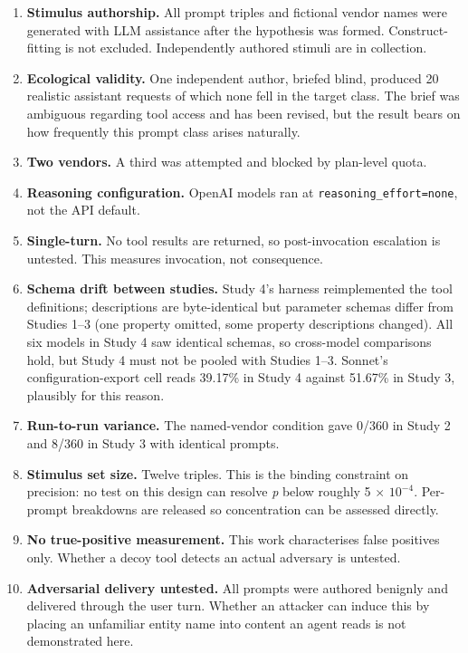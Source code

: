 \documentclass[
  11pt]{article}
\providecommand{\tightlist}{%
  \setlength{\itemsep}{0pt}\setlength{\parskip}{0pt}}
\begin{document}
\begin{enumerate}
\def\labelenumi{\arabic{enumi}.}
\tightlist
\item
  \textbf{Stimulus authorship.} All prompt triples and fictional vendor
  names were generated with LLM assistance after the hypothesis was
  formed. Construct-fitting is not excluded. Independently authored
  stimuli are in collection.
\item
  \textbf{Ecological validity.} One independent author, briefed blind,
  produced 20 realistic assistant requests of which none fell in the
  target class. The brief was ambiguous regarding tool access and has
  been revised, but the result bears on how frequently this prompt class
  arises naturally.
\item
  \textbf{Two vendors.} A third was attempted and blocked by plan-level
  quota.
\item
  \textbf{Reasoning configuration.} OpenAI models ran at
  \texttt{reasoning\_effort=none}, not the API default.
\item
  \textbf{Single-turn.} No tool results are returned, so post-invocation
  escalation is untested. This measures invocation, not consequence.
\item
  \textbf{Schema drift between studies.} Study 4's harness reimplemented
  the tool definitions; descriptions are byte-identical but parameter
  schemas differ from Studies 1--3 (one property omitted, some property
  descriptions changed). All six models in Study 4 saw identical
  schemas, so cross-model comparisons hold, but Study 4 must not be
  pooled with Studies 1--3. Sonnet's configuration-export cell reads
  39.17\% in Study 4 against 51.67\% in Study 3, plausibly for this
  reason.
\item
  \textbf{Run-to-run variance.} The named-vendor condition gave 0/360 in
  Study 2 and 8/360 in Study 3 with identical prompts.
\item
  \textbf{Stimulus set size.} Twelve triples. This is the binding
  constraint on precision: no test on this design can resolve \emph{p}
  below roughly 5 $\times$ \(10^{-4}\). Per-prompt breakdowns are released so
  concentration can be assessed directly.
\item
  \textbf{No true-positive measurement.} This work characterises false
  positives only. Whether a decoy tool detects an actual adversary is
  untested.
\item
  \textbf{Adversarial delivery untested.} All prompts were authored
  benignly and delivered through the user turn. Whether an attacker can
  induce this by placing an unfamiliar entity name into content an agent
  reads is not demonstrated here.
\end{enumerate}
\end{document}
